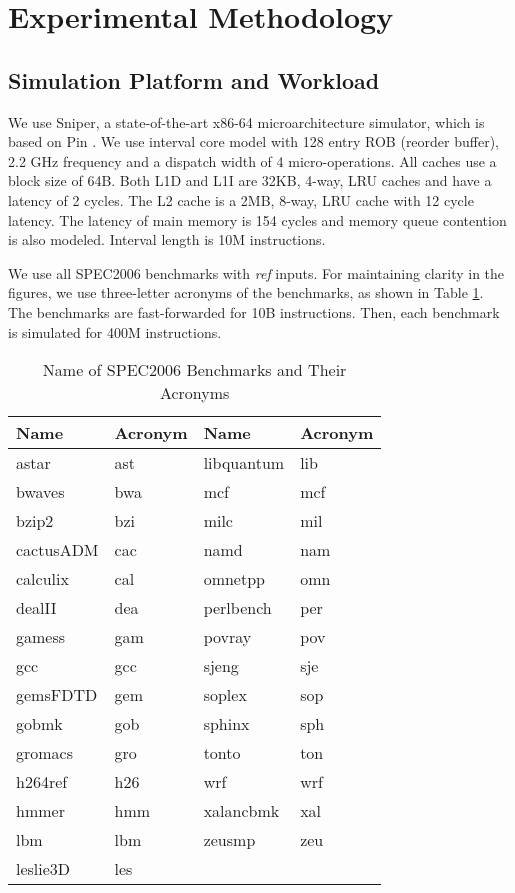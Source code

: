 

\section{Experimental Methodology}\label{sec:experimentmethodology}

\subsection{Simulation Platform and Workload}\label{sec:Simulation}
We use Sniper, a state-of-the-art x86-64 microarchitecture simulator, which is based on Pin \cite{CarHei2011_Sniper}.  We use interval core model with 128 entry ROB (reorder buffer), 2.2 GHz frequency and a dispatch width of 4 micro-operations.  All caches use a block size of 64B. Both L1D and L1I are 32KB, 4-way, LRU caches and have a latency of 2 cycles. The L2 cache is a 2MB, 8-way, LRU cache with 12 cycle latency.  The latency of main memory is 154 cycles and memory queue contention is also modeled. Interval length is 10M instructions.

We use all SPEC2006 benchmarks with \textit{ref} inputs. For maintaining clarity in the figures, we use three-letter acronyms of the benchmarks, as shown in Table \ref{tab:shortform}. The benchmarks are fast-forwarded for 10B instructions. Then, each benchmark is simulated for 400M instructions.  

\begin{table}[htbp]
  \centering
  \caption{Name of SPEC2006 Benchmarks and Their Acronyms}
    \begin{tabular}{|l|l||l|l|}
   \hline
    Name  & Acronym & Name  & Acronym \\
   \hline
    astar & ast   & libquantum & lib \\\hline
    bwaves & bwa   & mcf   & mcf \\\hline
    bzip2 & bzi   & milc  & mil \\\hline
    cactusADM & cac   & namd  & nam \\\hline
    calculix & cal   & omnetpp & omn \\\hline
    dealII & dea   & perlbench & per \\\hline
    gamess & gam   & povray & pov \\\hline
    gcc   & gcc   & sjeng & sje \\\hline
    gemsFDTD & gem   & soplex & sop \\\hline
    gobmk & gob   & sphinx & sph \\\hline
    gromacs & gro   & tonto & ton \\\hline
    h264ref & h26   & wrf   & wrf \\\hline
    hmmer & hmm   & xalancbmk & xal \\\hline
    lbm   & lbm   & zeusmp & zeu \\\hline
    leslie3D & les   &       &  \\\hline
  
    \end{tabular}\label{tab:shortform}\end{table}

